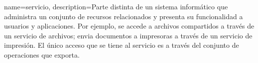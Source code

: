 \documentclass[
	fontsize=12pt, %
	twoside=false, %
	numbers=noenddot, %
]{kaobook}
\begin{document}

 



 

{	name=servicio,
	description={Parte distinta de un sistema inform\'atico que administra un conjunto de recursos relacionados y presenta su funcionalidad a usuarios y aplicaciones. Por ejemplo, se accede a archivos compartidos a trav\'es de un servicio de archivos; envia documentos a impresoras a trav\'es de un servicio de impresi\'on. El \'unico acceso que se tiene al servicio es a trav\'es del conjunto de operaciones que exporta.} }





 

\printglossary








\printindex %




\clearpage
\thispagestyle{empty}
\null%
\clearpage


\end{document}
